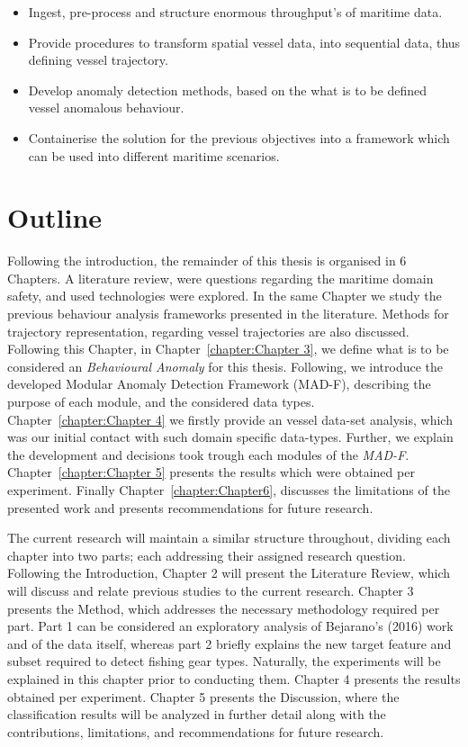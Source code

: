 \begin{itemize}
\item Ingest, pre-process and structure enormous throughput's of maritime data.
\item Provide procedures to transform spatial vessel data, into sequential data, thus defining vessel trajectory.
\item Develop anomaly detection methods, based on the what is to be defined vessel anomalous behaviour.
\item Containerise the solution for the previous objectives into a framework which can be used into different maritime scenarios.  
\end{itemize}

\section{Outline}
Following the introduction, the remainder of this thesis is organised in 6 Chapters. A literature review, were questions regarding the maritime domain safety, and used technologies were explored. In the same Chapter we study the previous behaviour analysis frameworks presented in the literature. Methods for trajectory representation, regarding vessel trajectories are also discussed. Following this Chapter, in Chapter~\ref{chapter:Chapter 3}, we define what is to be considered an \emph{Behavioural Anomaly} for this thesis. Following, we introduce the developed Modular Anomaly Detection Framework (MAD-F), describing the purpose of each module, and the considered data types. Chapter~\ref{chapter:Chapter 4} we firstly provide an vessel data-set analysis, which was our initial contact with such domain specific data-types. Further, we explain the development and decisions took trough each modules of the \emph{MAD-F}. Chapter~\ref{chapter:Chapter 5} presents the results which were obtained per experiment. Finally Chapter~\ref{chapter:Chapter6}, discusses the limitations of the presented work and presents recommendations for future research.

\iffalse
The current research will maintain a similar structure throughout, dividing each chapter into two
parts; each addressing their assigned research question. Following the Introduction, Chapter 2 will
present the Literature Review, which will discuss and relate previous studies to the current research.
Chapter 3 presents the Method, which addresses the necessary methodology required per part. Part 1
can be considered an exploratory analysis of Bejarano’s (2016) work and of the data itself, whereas
part 2 briefly explains the new target feature and subset required to detect fishing gear types.
Naturally, the experiments will be explained in this chapter prior to conducting them. Chapter 4
presents the results obtained per experiment. Chapter 5 presents the Discussion, where the
classification results will be analyzed in further detail along with the contributions, limitations, and recommendations for future research.

